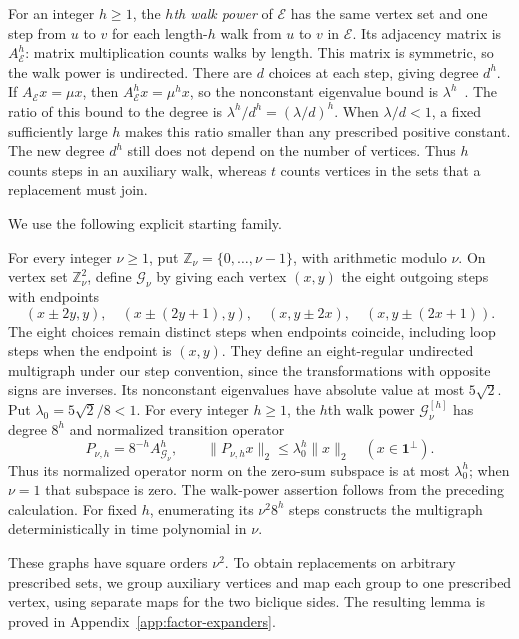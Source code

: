 For an integer $h\ge1$, the \emph{$h$th walk power} of
$\mathcal E$ has the same vertex set and one step from $u$ to $v$
for each length-$h$ walk from $u$ to $v$ in $\mathcal E$.
Its adjacency matrix is $A_{\mathcal E}^h$: matrix multiplication
counts walks by length. This matrix is symmetric, so the walk power
is undirected. There are $d$ choices at each step, giving degree
$d^h$. If $A_{\mathcal E}x=\mu x$, then
$A_{\mathcal E}^hx=\mu^hx$, so the nonconstant eigenvalue bound is
$\lambda^h$~\cite[Section~2]{HLW2006}. The ratio of this bound to the
degree is $\lambda^h/d^h=(\lambda/d)^h$.
When $\lambda/d<1$, a fixed sufficiently large $h$ makes this ratio
smaller than any prescribed positive constant. The new degree
$d^h$ still does not depend on the number of vertices. Thus $h$
counts steps in an auxiliary walk, whereas $t$ counts vertices in
the sets that a replacement must join.

We use the following explicit starting family.

\begin{theorem}
\label{thm:auxiliary-expander-family}
For every integer $\nu\ge1$, put
$\mathbb Z_\nu=\{0,\ldots,\nu-1\}$, with arithmetic modulo $\nu$.
On vertex set $\mathbb Z_\nu^2$, define $\mathcal G_\nu$ by giving
each vertex $(x,y)$ the eight
outgoing steps with endpoints
\[
 (x\pm2y,y),\quad (x\pm(2y+1),y),\quad
 (x,y\pm2x),\quad (x,y\pm(2x+1)).
\]
The eight choices remain distinct steps when endpoints coincide,
including loop steps when the endpoint is $(x,y)$. They define an
eight-regular undirected multigraph under our step convention,
since the transformations with opposite signs are inverses.
Its nonconstant eigenvalues have absolute value at most $5\sqrt2$.
Put $\lambda_0=5\sqrt2/8<1$. For every integer $h\ge1$, the
$h$th walk power $\mathcal G_\nu^{[h]}$ has degree $8^h$ and
normalized transition operator
\[
 P_{\nu,h}=8^{-h}A_{\mathcal G_\nu}^h,\qquad
 \|P_{\nu,h}x\|_2\le\lambda_0^h\|x\|_2
 \quad(x\in\mathbf1^\perp).
\]
Thus its normalized operator norm on the zero-sum subspace is at
most $\lambda_0^h$; when $\nu=1$ that subspace is zero. The
walk-power assertion follows from the preceding calculation.
For fixed $h$, enumerating its $\nu^2 8^h$ steps constructs the
multigraph deterministically in time polynomial in $\nu$.
\end{theorem}

These graphs have square orders $\nu^2$. To obtain replacements
on arbitrary prescribed sets, we group auxiliary vertices and map
each group to one prescribed vertex, using separate maps for the
two biclique sides. The resulting lemma is proved in
Appendix~\ref{app:factor-expanders}.

